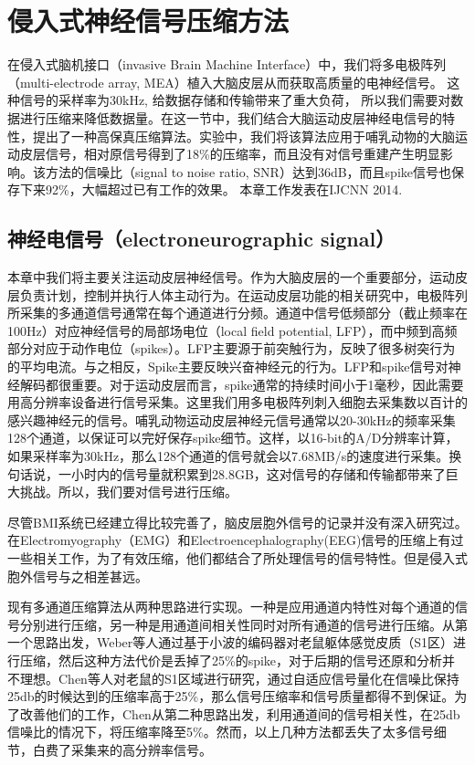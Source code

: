 \chapter{侵入式神经信号压缩方法}

在侵入式脑机接口（invasive Brain Machine Interface）中，我们将多电极阵列（multi-electrode array, MEA）植入大脑皮层从而获取高质量的电神经信号。 这种信号的采样率为30kHz, 给数据存储和传输带来了重大负荷， 所以我们需要对数据进行压缩来降低数据量。在这一节中，我们结合大脑运动皮层神经电信号的特性，提出了一种高保真压缩算法。实验中，我们将该算法应用于哺乳动物的大脑运动皮层信号，相对原信号得到了18\%的压缩率，而且没有对信号重建产生明显影响。该方法的信噪比（signal to noise ratio, SNR）达到36dB，而且spike信号也保存下来92\%，大幅超过已有工作的效果。 本章工作发表在IJCNN 2014\cite{}.

\section{神经电信号（electroneurographic signal）}

本章中我们将主要关注运动皮层神经信号。作为大脑皮层的一个重要部分，运动皮层负责计划，控制并执行人体主动行为。在运动皮层功能的相关研究中，电极阵列所采集的多通道信号通常在每个通道进行分频。通道中信号低频部分（截止频率在100Hz）对应神经信号的局部场电位（local field potential, LFP），而中频到高频部分对应于动作电位（spikes）。LFP主要源于前突触行为，反映了很多树突行为的平均电流。与之相反，Spike主要反映兴奋神经元的行为。LFP和spike信号对神经解码都很重要。对于运动皮层而言，spike通常的持续时间小于1毫秒，因此需要用高分辨率设备进行信号采集。这里我们用多电极阵列刺入细胞去采集数以百计的感兴趣神经元的信号。哺乳动物运动皮层神经元信号通常以20-30kHz的频率采集128个通道，以保证可以完好保存spike细节。这样，以16-bit的A/D分辨率计算，如果采样率为30kHz，那么128个通道的信号就会以7.68MB/s的速度进行采集。换句话说，一小时内的信号量就积累到28.8GB，这对信号的存储和传输都带来了巨大挑战。所以，我们要对信号进行压缩。

尽管BMI系统已经建立得比较完善了，脑皮层胞外信号的记录并没有深入研究过。在Electromyography（EMG）和Electroencephalography(EEG)信号的压缩上有过一些相关工作\cite{}，为了有效压缩，他们都结合了所处理信号的信号特性。但是侵入式胞外信号与之相差甚远。

现有多通道压缩算法从两种思路进行实现。一种是应用通道内特性对每个通道的信号分别进行压缩，另一种是用通道间相关性同时对所有通道的信号进行压缩。从第一个思路出发，Weber等人通过基于小波的编码器对老鼠躯体感觉皮质（S1区）进行压缩，然后这种方法代价是丢掉了25\%的spike，对于后期的信号还原和分析并不理想。Chen等人对老鼠的S1区域进行研究，通过自适应信号量化在信噪比保持25db的时候达到的压缩率高于25\%，那么信号压缩率和信号质量都得不到保证。为了改善他们的工作，Chen从第二种思路出发，利用通道间的信号相关性，在25db信噪比的情况下，将压缩率降至5\%。然而，以上几种方法都丢失了太多信号细节，白费了采集来的高分辨率信号。

